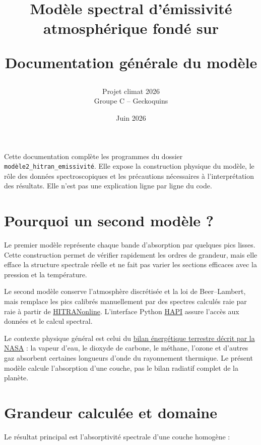 \documentclass[11pt,a4paper]{article}
\title{\vspace{2.2cm}
  {\color{bleuCAPECL}\LARGE\bfseries Modèle spectral d'émissivité\\[0.25em]
  atmosphérique fondé sur \HITRAN}\par\vspace{0.8cm}
  {\large Documentation générale du modèle}}
\author{Projet climat 2026\\Groupe C -- Geckoquins}
\date{Juin 2026}
\newcommand{\code}[1]{\texttt{#1}}
\begin{document}
\maketitle
\thispagestyle{empty}
\vfill
\begin{center}
\begin{minipage}{0.78\textwidth}
\small
Cette documentation complète les programmes du dossier
\code{modèle2\_hitran\_emissivité}. Elle expose la construction physique du
modèle, le rôle des données spectroscopiques et les précautions nécessaires à
l'interprétation des résultats. Elle n'est pas une explication ligne par
ligne du code.
\end{minipage}
\end{center}
\vfill
\newpage

\tableofcontents
\newpage

\section{Pourquoi un second modèle ?}

Le premier modèle représente chaque bande d'absorption par quelques pics
lisses. Cette construction permet de vérifier rapidement les ordres de
grandeur, mais elle efface la structure spectrale réelle et ne fait pas varier
les sections efficaces avec la pression et la température.

Le second modèle conserve l'atmosphère discrétisée et la loi de
Beer--Lambert, mais remplace les pics calibrés manuellement par des spectres
calculés raie par raie à partir de
\href{https://hitran.org/}{HITRANonline}. L'interface Python
\href{https://hitran.org/hapi/}{HAPI} assure l'accès aux données et le calcul
spectral.

Le contexte physique général est celui du
\href{https://science.nasa.gov/earth/earth-observatory/climate-and-earths-energy-budget/}{bilan
énergétique terrestre décrit par la NASA} : la vapeur d'eau, le dioxyde de
carbone, le méthane, l'ozone et d'autres gaz absorbent certaines longueurs
d'onde du rayonnement thermique. Le présent modèle calcule l'absorption d'une
couche, pas le bilan radiatif complet de la planète.

\section{Grandeur calculée et domaine}

Le résultat principal est l'absorptivité spectrale d'une couche homogène :
\end{document}
